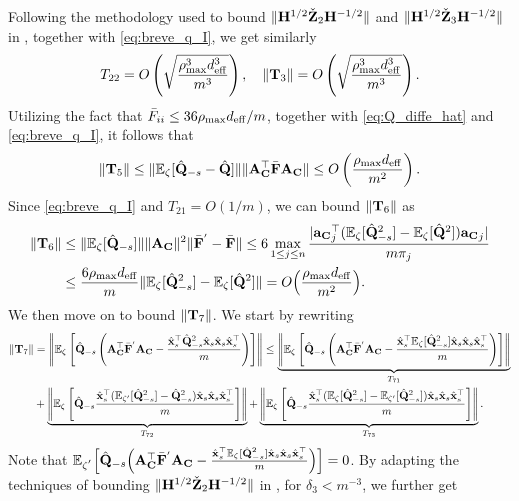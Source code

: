 \documentclass[11pt,a4paper]{article}
\begin{document}
Following the methodology used to bound $\|\mathbf{H}^{1/2}\check{\mathbf{Z}}_2\mathbf{H}^{-1/2}\|$ and $\|\mathbf{H}^{1/2}\check{\mathbf{Z}}_3\mathbf{H}^{-1/2}\|$ in , together with \eqref{eq:breve_q_I}, we get similarly 
\begin{equation*}
    T_{22}=O \left(\sqrt{\frac{\rho_{\max}^3d^3_{\mathrm{eff}}}{m^3}} \right), \quad \|\mathbf{T}_3\|=O \left(\sqrt{\frac{\rho_{\max}^3d^3_{\mathrm{eff}}}{m^3}} \right).
\end{equation*}
Utilizing the fact that $\bar F_{ii}\leq 36\rho_{\max} d_{\mathrm{eff}}/m$, together with \eqref{eq:Q_diffe_hat} and \eqref{eq:breve_q_I}, it follows that 
\begin{equation*}
    \|\mathbf{T}_5\|\leq \|{\mathbb{E}}_{\zeta}[\hat{\mathbf{Q}}_{-s}-\hat{\mathbf{Q}}] \|\|\mathbf{A}_{\mathbf{C}}^\top\bar{\mathbf{F}}\mathbf{A}_{\mathbf{C}}\|\leq O\left(\frac{\rho_{\max} d_{\mathrm{eff}}}{m^2}\right).
\end{equation*}
Since \eqref{eq:breve_q_I} and  $T_{21}=O(1/m)$, we can bound $\|\mathbf{T}_6\|$ as
\begin{align}
    \|\mathbf{T}_6\|&\leq\|{\mathbb{E}}_{\zeta}[\hat{\mathbf{Q}}_{-s}]\|\|\mathbf{A}_{\mathbf{C}}\|^2\|\bar{\mathbf{F}}^{'}-\bar{\mathbf{F}}\|\leq 6\mathop{\max}\limits_{1\leq  j\leq  n}\frac{|{\mathbf{a}_{\mathbf{C}}}^\top_j ({\mathbb{E}}_{\zeta}[\hat{\mathbf{Q}}^2_{-s}]-{\mathbb{E}}_{\zeta}[\hat{\mathbf{Q}}^2]){\mathbf{a}_{\mathbf{C}}}_j|}{m\pi_j}\nonumber\\
    &\leq \frac{6\rho_{\max} d_{\mathrm{eff}}}{m}\|{\mathbb{E}}_{\zeta}[\hat{\mathbf{Q}}^2_{-s}]-{\mathbb{E}}_{\zeta}[\hat{\mathbf{Q}}^2]\| = O\Big(\frac{\rho_{\max} d_{\mathrm{eff}}}{m^2}\Big).\nonumber
\end{align}
We then move on to bound $\|\mathbf{T}_7\|$. 
We start by rewriting
\begin{align}
    \|\mathbf{T}_7\|&=\left\|{\mathbb{E}}_{\zeta}\left[\hat{\mathbf{Q}}_{-s}\left(\mathbf{A}_{\mathbf{C}}^\top\bar{\mathbf{F}}^{'}\mathbf{A}_{\mathbf{C}}-\frac{\hat{\mathbf{x}}_s^\top\hat{\mathbf{Q}}^2_{-s}\hat{\mathbf{x}}_s\hat{\mathbf{x}}_s\hat{\mathbf{x}}_s^\top}{m}\right)\right] \right\|\leq \underbrace{\left\|{\mathbb{E}}_{\zeta}\left[\hat{\mathbf{Q}}_{-s}\left(\mathbf{A}_{\mathbf{C}}^\top\bar{\mathbf{F}}^{'}\mathbf{A}_{\mathbf{C}}-\frac{\hat{\mathbf{x}}_s^\top{\mathbb{E}}_{\zeta}[\hat{\mathbf{Q}}^2_{-s}]\hat{\mathbf{x}}_s\hat{\mathbf{x}}_s\hat{\mathbf{x}}_s^\top}{m}\right)\right] \right\|}_{T_{71}}\nonumber\\
    &+\underbrace{\left\|{\mathbb{E}}_{\zeta}\left[\hat{\mathbf{Q}}_{-s}\frac{\hat{\mathbf{x}}_s^\top({\mathbb{E}}_{\zeta'}[\hat{\mathbf{Q}}^2_{-s}]-\hat{\mathbf{Q}}^2_{-s})\hat{\mathbf{x}}_s\hat{\mathbf{x}}_s\hat{\mathbf{x}}_s^\top}{m}\right] \right\|}_{T_{72}}+\underbrace{\left\|{\mathbb{E}}_{\zeta}\left[\hat{\mathbf{Q}}_{-s}\frac{\hat{\mathbf{x}}_s^\top({\mathbb{E}}_{\zeta}[\hat{\mathbf{Q}}^2_{-s}]-{\mathbb{E}}_{\zeta'}[\hat{\mathbf{Q}}^2_{-s}])\hat{\mathbf{x}}_s\hat{\mathbf{x}}_s\hat{\mathbf{x}}_s^\top}{m}\right] \right\|}_{T_{73}}. \nonumber
\end{align}
Note that ${\mathbb{E}}_{\zeta^{'}}\Big[\hat{\mathbf{Q}}_{-s}\Big(\mathbf{A}_{\mathbf{C}}^\top\bar{\mathbf{F}}^{'}\mathbf{A}_{\mathbf{C}}-\frac{\hat{\mathbf{x}}_s^\top{\mathbb{E}}_{\zeta}[\hat{\mathbf{Q}}^2_{-s}]\hat{\mathbf{x}}_s\hat{\mathbf{x}}_s\hat{\mathbf{x}}_s^\top}{m}\Big)\Big]=0$. By adapting the  techniques of bounding   $\|\mathbf{H}^{1/2}\check{\mathbf{Z}}_2\mathbf{H}^{-1/2}\|$ in , for  $\delta_3<m^{-3}$,  we further get
\end{document}
